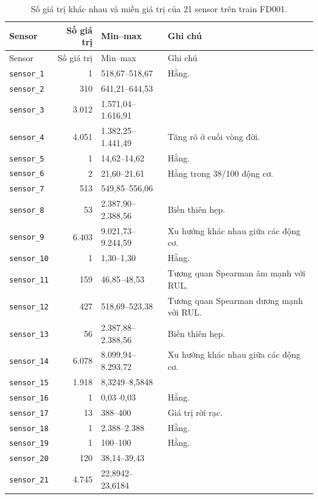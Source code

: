 \begin{small}
\begin{longtable}{l r l L{6.5cm}}
\caption[Hồ sơ sensor FD001]{Số giá trị khác nhau và miền giá trị của 21 sensor trên train FD001.}\label{tab:sensor-profile}\\
\toprule
Sensor & Số giá trị & Min--max & Ghi chú\\
\midrule
\endfirsthead
\toprule
Sensor & Số giá trị & Min--max & Ghi chú\\
\midrule
\endhead
\bottomrule
\endlastfoot
\texttt{sensor\_1} & 1 & 518,67--518,67 & Hằng.\\
\texttt{sensor\_2} & 310 & 641,21--644,53 & \\
\texttt{sensor\_3} & 3.012 & 1.571,04--1.616,91 & \\
\texttt{sensor\_4} & 4.051 & 1.382,25--1.441,49 & Tăng rõ ở cuối vòng đời.\\
\texttt{sensor\_5} & 1 & 14,62--14,62 & Hằng.\\
\texttt{sensor\_6} & 2 & 21,60--21,61 & Hằng trong 38/100 động cơ.\\
\texttt{sensor\_7} & 513 & 549,85--556,06 & \\
\texttt{sensor\_8} & 53 & 2.387,90--2.388,56 & Biến thiên hẹp.\\
\texttt{sensor\_9} & 6.403 & 9.021,73--9.244,59 & Xu hướng khác nhau giữa các động cơ.\\
\texttt{sensor\_10} & 1 & 1,30--1,30 & Hằng.\\
\texttt{sensor\_11} & 159 & 46,85--48,53 & Tương quan Spearman âm mạnh với RUL.\\
\texttt{sensor\_12} & 427 & 518,69--523,38 & Tương quan Spearman dương mạnh với RUL.\\
\texttt{sensor\_13} & 56 & 2.387,88--2.388,56 & Biến thiên hẹp.\\
\texttt{sensor\_14} & 6.078 & 8.099,94--8.293,72 & Xu hướng khác nhau giữa các động cơ.\\
\texttt{sensor\_15} & 1.918 & 8,3249--8,5848 & \\
\texttt{sensor\_16} & 1 & 0,03--0,03 & Hằng.\\
\texttt{sensor\_17} & 13 & 388--400 & Giá trị rời rạc.\\
\texttt{sensor\_18} & 1 & 2.388--2.388 & Hằng.\\
\texttt{sensor\_19} & 1 & 100--100 & Hằng.\\
\texttt{sensor\_20} & 120 & 38,14--39,43 & \\
\texttt{sensor\_21} & 4.745 & 22,8942--23,6184 & \\
\end{longtable}
\end{small}

